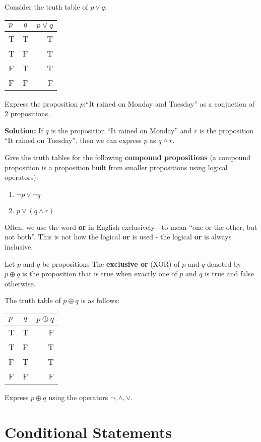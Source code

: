 \documentclass[12t]{scrartcl}
\theoremstyle{plain}
\theoremstyle{definition}
\begin{document}
Consider the truth table of $p\vee q$:
\begin{tabular}{lc|r}
$p$ & $q$ & $p\vee q$ \\\hline
T & T & T \\
T & F & T \\
F & T & T \\
F & F & F
\end{tabular}

\example Express the proposition $p$:``It rained on Monday and Tuesday'' as a conjuction of 2 propositions.

\vspace{0cm}
\textbf{Solution:} If $q$ is the proposition ``It rained on Monday'' and $r$ is the proposition ``It rained on Tuesday'', then we can express $p$ as $q\wedge r$.

\exercise Give the truth tables for the following \textbf{compound propositions} (a compound proposition is a proposition built from smaller propositions using logical operators):
\begin{enumerate}[nosep]
    \item $\neg p\vee \neg q$
    \item $p \vee (q \wedge r)$
\end{enumerate}

Often, we use the word \textbf{or} in English exclusively - to mean ``one or the other, but not both''. This is not how the logical \textbf{or} is used - the logical \textbf{or} is always inclusive.

 Let $p$ and $q$ be propositions The \textbf{exclusive or} (XOR) of $p$ and $q$ denoted by $p\oplus q$ is the proposition that is true when exactly one of $p$ and $q$ is true and false otherwise.

The truth table of $p\oplus q$ is as follows:
\begin{tabular}{lc|r}
$p$ & $q$ & $p\oplus q$ \\\hline
T & T & F \\
T & F & T \\
F & T & T \\
F & F & F
\end{tabular}

\exercise Express $p\oplus q$ using the operators $\neg,\wedge,\vee$.

\section{Conditional Statements}
\end{document}
